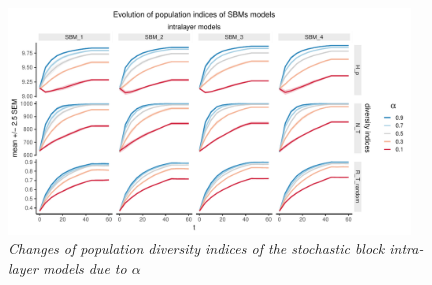 \begin{figure}[H]
    \centering
    \includegraphics[width=0.95\textwidth,center]{../figures/report/FigS4.pdf}
    \caption{\label{supp:4}
    \textit{Changes of population diversity indices of the stochastic block intra-layer models  due  to $\alpha$}
    }
\end{figure}